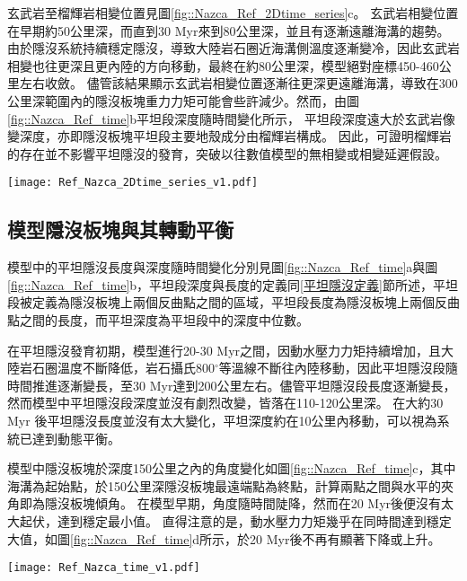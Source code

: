 玄武岩至榴輝岩相變位置見圖\ref{fig::Nazca_Ref_2Dtime_series}c。
玄武岩相變位置在早期約50公里深，而直到30 Myr來到80公里深，並且有逐漸遠離海溝的趨勢。
由於隱沒系統持續穩定隱沒，導致大陸岩石圈近海溝側溫度逐漸變冷，因此玄武岩相變也往更深且更內陸的方向移動，最終在約80公里深，模型絕對座標450-460公里左右收斂。
儘管該結果顯示玄武岩相變位置逐漸往更深更遠離海溝，導致在300公里深範圍內的隱沒板塊重力力矩可能會些許減少。然而，由圖\ref{fig::Nazca_Ref_time}b平坦段深度隨時間變化所示，
平坦段深度遠大於玄武岩像變深度，亦即隱沒板塊平坦段主要地殼成分由榴輝岩構成。
因此，可證明榴輝岩的存在並不影響平坦隱沒的發育，突破以往數值模型的無相變或相變延遲假設。
\begin{figure*}[h]
    \centering
    \texttt{[image: Ref\_Nazca\_2Dtime\_series\_v1.pdf]}
    \caption[智利參考模型部分熔融、岩漿庫與玄武岩相變時空關係圖]{智利參考模型部分熔融、岩漿庫與玄武岩相變時空關係圖。}
    \label{fig::Nazca_Ref_2Dtime_series}
\end{figure*}

\newpage
\subsection{模型隱沒板塊與其轉動平衡}
模型中的平坦隱沒長度與深度隨時間變化分別見圖\ref{fig::Nazca_Ref_time}a與圖\ref{fig::Nazca_Ref_time}b，平坦段深度與長度的定義同\ref{平坦隱沒定義}節所述，平坦段被定義為隱沒板塊上兩個反曲點之間的區域，平坦段長度為隱沒板塊上兩個反曲點之間的長度，而平坦深度為平坦段中的深度中位數。

在平坦隱沒發育初期，模型進行20-30 Myr之間，因動水壓力力矩持續增加，且大陸岩石圈溫度不斷降低，岩石攝氏800$^{\circ}$等溫線不斷往內陸移動，因此平坦隱沒段隨時間推進逐漸變長，至30 Myr達到200公里左右。儘管平坦隱沒段長度逐漸變長，然而模型中平坦隱沒段深度並沒有劇烈改變，皆落在110-120公里深。
在大約30 Myr 後平坦隱沒長度並沒有太大變化，平坦深度約在10公里內移動，可以視為系統已達到動態平衡。

模型中隱沒板塊於深度150公里之內的角度變化如圖\ref{fig::Nazca_Ref_time}c，其中海溝為起始點，於150公里深隱沒板塊最遠端點為終點，計算兩點之間與水平的夾角即為隱沒板塊傾角。
在模型早期，角度隨時間陡降，然而在20 Myr後便沒有太大起伏，達到穩定最小值。
直得注意的是，動水壓力力矩幾乎在同時間達到穩定大值，如圖\ref{fig::Nazca_Ref_time}d所示，於20 Myr後不再有顯著下降或上升。

\begin{figure*}[h]
    \centering
    \texttt{[image: Ref\_Nazca\_time\_v1.pdf]}
    \caption[智利參考模型隱沒板塊狀態隨時間變化]{智利參考模型隱沒板塊狀態隨時間變化。}
    \label{fig::Nazca_Ref_time}
\end{figure*}


